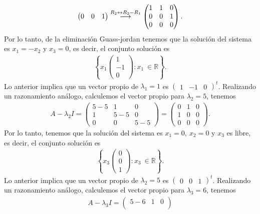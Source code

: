 \documentclass[11pt,letterpaper]{article}
\newcommand{\mR}{\mathbb{R}}
\newcommand{\grstep}[2][\relax]{%
   \ensuremath{\mathrel{
       {\mathop{\longrightarrow}\limits^{#2\mathstrut}_{
                                     \begin{subarray}{l} #1 \end{subarray}}}}}}
\begin{document}
\begin{enumerate}
\begin{align*}
\begin{pmatrix}
0 & 0 & 1
\end{pmatrix}
%
\grstep[]{R_2 \leftrightarrow R_2-R_1}
%
\begin{pmatrix}
1 & 1 & 0\\
0 & 0 & 1\\
0 & 0 & 0
\end{pmatrix}.
\end{align*}
Por lo tanto, de la eliminación Guass-jordan tenemos que la solución del sistema es $x_1=-x_2$ y $x_3=0$, es decir, el conjunto solución es
\begin{align*}
\left\{x_1\begin{pmatrix}
 1\\
-1\\
 0
\end{pmatrix}: x_1 \ \in \mR \right\}.
\end{align*}
Lo anterior implica que un vector propio de $\lambda_1=1$ es 
$\begin{pmatrix}
1 & -1 & 0
\end{pmatrix}^t$. Realizando un razonamiento análogo, calculemos el vector propio para $\lambda_2=5$, tenemos 
\begin{align*}
A-\lambda_2I=\begin{pmatrix}
5-5 & 1 & 0\\
1 & 5-5 & 0\\
0 & 0 & 5-5
\end{pmatrix}=\begin{pmatrix}
0 & 1 & 0\\
1 & 0 & 0\\
0 & 0 & 0
\end{pmatrix}.
\end{align*}
Por lo tanto, tenemos que la solución del sistema es $x_1=0,\ x_2=0$ y $x_3$ es libre, es decir, el conjunto solución es
\begin{align*}
\left\{x_3\begin{pmatrix}
0\\
0\\
1
\end{pmatrix}: x_3 \ \in \mR \right\}.
\end{align*}
Lo anterior implica que un vector propio de $\lambda_2=5$ es 
$\begin{pmatrix}
0 & 0 & 1
\end{pmatrix}^t$. Realizando un razonamiento análogo, calculemos el vector propio para $\lambda_3=6$, tenemos 
\begin{align*}
A-\lambda_3I=\begin{pmatrix}
5-6 & 1 & 0\\

\end{pmatrix}
\end{align*}
\end{enumerate}
\end{document}
